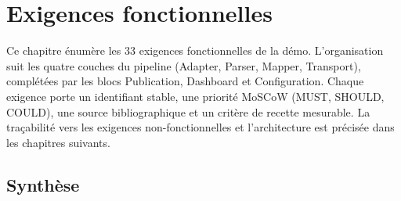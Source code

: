\chapter{Exigences fonctionnelles}
\label{ch:exigences-fonctionnelles}

Ce chapitre énumère les 33 exigences fonctionnelles de la démo. L'organisation suit les quatre couches du pipeline (Adapter, Parser, Mapper, Transport), complétées par les blocs Publication, Dashboard et Configuration. Chaque exigence porte un identifiant stable, une priorité MoSCoW (MUST, SHOULD, COULD), une source bibliographique et un critère de recette mesurable. La traçabilité vers les exigences non-fonctionnelles et l'architecture est précisée dans les chapitres suivants.

\section*{Synthèse}
\label{sec:ef-synthese}

